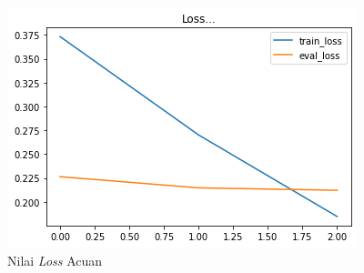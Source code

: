\begin{figure}[h]
    \begin{center}
        \includegraphics[width= 0.9\linewidth]{gambar/loss_concat_awal.png}
        \caption{Nilai \textit{Loss} Acuan}
        \label{fig: loss_baseline}
    \end{center}
\end{figure}

